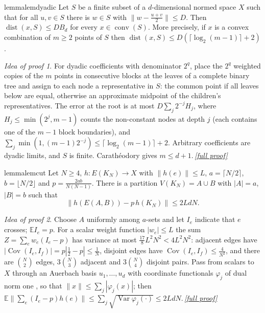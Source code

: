 \documentclass[11pt,a4paper]{article}
\theoremstyle{plain}
\theoremstyle{definition}
\theoremstyle{remark}
\newtheorem*{proofidea}{Idea of proof}
\newcommand{\fullproofref}[1]{\,\hyperref[#1]{\textit{[full proof]}}}
\newcommand{\E}{\mathbb E}
\newcommand{\Cov}{\operatorname{Cov}}
\newcommand{\Var}{\operatorname{Var}}
\newcommand{\conv}{\operatorname{conv}}
\newcommand{\dist}{\operatorname{dist}}
\newcommand{\norm}[1]{\left\|#1\right\|}
\begin{document}
\begin{restatable}{lemma}{lemdyadic}\label{lem:dyadic}
Let $S$ be a finite subset of a $d$-dimensional normed space $X$ such that for all $u,v\in S$ there is $w\in S$ with $\|w-\frac{u+v}2\|\le D$. Then $\dist(x,S)\le DB_d$ for every $x\in\conv(S)$. More precisely, if $x$ is a convex combination of $m\ge2$ points of $S$ then $\dist(x,S)\le D(\lceil\log_2(m-1)\rceil+2)$.
\end{restatable}
\begin{proofidea}
For dyadic coefficients with denominator $2^q$, place the $2^q$ weighted copies of the $m$ points in consecutive blocks at the leaves of a complete binary tree and assign to each node a representative in $S$: the common point if all leaves below are equal, otherwise an approximate midpoint of the children's representatives. The error at the root is at most $D\sum_j2^{-j}H_j$, where $H_j\le\min(2^j,m-1)$ counts the non-constant nodes at depth $j$ (each contains one of the $m-1$ block boundaries), and $\sum_j\min(1,(m-1)2^{-j})\le\lceil\log_2(m-1)\rceil+2$. Arbitrary coefficients are dyadic limits, and $S$ is finite. Carathéodory gives $m\le d+1$.\fullproofref{pf:dyadic}
\end{proofidea}

\begin{restatable}{lemma}{lemcut}\label{lem:cut}
Let $N\ge4$, $h\colon E(K_N)\to X$ with $\|h(e)\|\le L$, $a=\lceil N/2\rceil$, $b=\lfloor N/2\rfloor$ and $p=\frac{2ab}{N(N-1)}$. There is a partition $V(K_N)=A\cup B$ with $|A|=a$, $|B|=b$ such that
\[
 \norm{h(E(A,B))-p\,h(K_N)}\le 2LdN .
\]
\end{restatable}
\begin{proofidea}
Choose $A$ uniformly among $a$-sets and let $I_e$ indicate that $e$ crosses; $\E I_e=p$. For a scalar weight function $|w_e|\le L$ the sum $Z=\sum_ew_e(I_e-p)$ has variance at most $\frac{17}8L^2N^2<4L^2N^2$: adjacent edges have $|\Cov(I_e,I_f)|=p|\frac12-p|\le\frac1N$, disjoint edges have $\Cov(I_e,I_f)\le\frac4{N^2}$, and there are $\binom N2$ edges, $3\binom N3$ adjacent and $3\binom N4$ disjoint pairs. Pass from scalars to $X$ through an Auerbach basis $u_1,\dots,u_d$ with coordinate functionals $\varphi_j$ of dual norm one \cite[Prop.~1.c.3]{LT77}, so that $\|x\|\le\sum_j|\varphi_j(x)|$; then $\E\|\sum_e(I_e-p)h(e)\|\le\sum_j\sqrt{\Var\varphi_j(\cdot)}\le 2LdN$.\fullproofref{pf:cut}
\end{proofidea}
\end{document}
